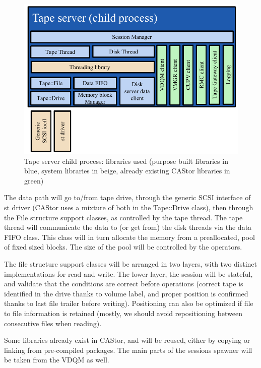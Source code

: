 \begin{figure}[h]
\begin{center}
\includegraphics{images/TapeServerChildProcess}
\end{center}
\caption{\label{tsChildProcess}Tape server child process: libraries used (purpose built libraries in blue, system libraries in beige, already existing CAStor libraries in green)}
\end{figure}

The data path will go to/from tape drive, through the generic SCSI interface of st driver (CAStor uses a
mixture of both in the Tape::Drive class), then through the File structure support classes, as controlled by
the tape thread. The tape thread will communicate the data to (or get from) the disk threads via the 
data FIFO class. This class will in turn allocate the memory from a preallocated, pool of
fixed sized blocks. The size of the pool will be controlled by the operators.

The file structure support classes will be arranged in two layers, with two distinct 
implementations for read and write. The lower layer, the session will be stateful, and validate
that the conditions are correct before operations (correct tape is identified in the drive thanks 
to volume label, and proper position is confirmed thanks to last file trailer before writing).
Positioning can also be optimized if file to file information is retained (mostly, we should 
avoid repositioning between consecutive files when reading).

Some libraries already exist in CAStor, and will be reused, either by copying or linking from pre-compiled 
packages. The main parts of the sessions spawner will be taken from the VDQM as well.



